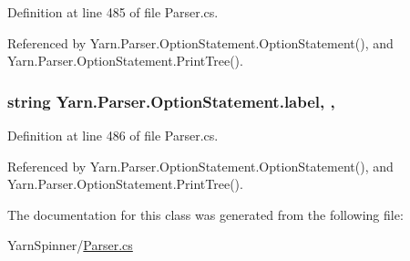 Definition at line 485 of file Parser.\-cs.



Referenced by Yarn.\-Parser.\-Option\-Statement.\-Option\-Statement(), and Yarn.\-Parser.\-Option\-Statement.\-Print\-Tree().

\hypertarget{a00140_a7f27d78e67fed6992767e995e70fc468}{
\subsubsection[{label}]{\setlength{\rightskip}{0pt plus 5cm}string Yarn.\-Parser.\-Option\-Statement.\-label\hspace{0.3cm}{\ttfamily [get]}, {\ttfamily [set]}, {\ttfamily [package]}}}\label{a00140_a7f27d78e67fed6992767e995e70fc468}


Definition at line 486 of file Parser.\-cs.



Referenced by Yarn.\-Parser.\-Option\-Statement.\-Option\-Statement(), and Yarn.\-Parser.\-Option\-Statement.\-Print\-Tree().



The documentation for this class was generated from the following file\-:\begin{DoxyCompactItemize}
\item 
Yarn\-Spinner/\hyperlink{a00301}{Parser.\-cs}\end{DoxyCompactItemize}
